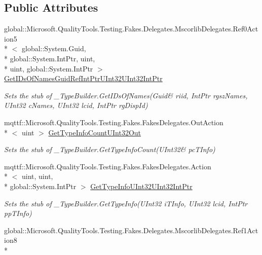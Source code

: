\subsection*{Public Attributes}
\begin{DoxyCompactItemize}
\item 
global\-::\-Microsoft.\-Quality\-Tools.\-Testing.\-Fakes.\-Delegates.\-Mscorlib\-Delegates.\-Ref0\-Action5\\*
$<$ global\-::\-System.\-Guid, \\*
global\-::\-System.\-Int\-Ptr, uint, \\*
uint, global\-::\-System.\-Int\-Ptr $>$ \hyperlink{class_system_1_1_runtime_1_1_interop_services_1_1_fakes_1_1_stub___type_builder_a99e63eac3e31e5f4d4971b116f23d112}{Get\-I\-Ds\-Of\-Names\-Guid\-Ref\-Int\-Ptr\-U\-Int32\-U\-Int32\-Int\-Ptr}
\begin{DoxyCompactList}\small\item\em Sets the stub of \-\_\-\-Type\-Builder.\-Get\-I\-Ds\-Of\-Names(Guid\& riid, Int\-Ptr rgsz\-Names, U\-Int32 c\-Names, U\-Int32 lcid, Int\-Ptr rg\-Disp\-Id)\end{DoxyCompactList}\item 
mqttf\-::\-Microsoft.\-Quality\-Tools.\-Testing.\-Fakes.\-Fakes\-Delegates.\-Out\-Action\\*
$<$ uint $>$ \hyperlink{class_system_1_1_runtime_1_1_interop_services_1_1_fakes_1_1_stub___type_builder_a4305a8f7eb35314e8bc191989b87adce}{Get\-Type\-Info\-Count\-U\-Int32\-Out}
\begin{DoxyCompactList}\small\item\em Sets the stub of \-\_\-\-Type\-Builder.\-Get\-Type\-Info\-Count(U\-Int32\& pc\-T\-Info)\end{DoxyCompactList}\item 
mqttf\-::\-Microsoft.\-Quality\-Tools.\-Testing.\-Fakes.\-Fakes\-Delegates.\-Action\\*
$<$ uint, uint, \\*
global\-::\-System.\-Int\-Ptr $>$ \hyperlink{class_system_1_1_runtime_1_1_interop_services_1_1_fakes_1_1_stub___type_builder_ab083c6cd6df5a9e16cae06da989a92b0}{Get\-Type\-Info\-U\-Int32\-U\-Int32\-Int\-Ptr}
\begin{DoxyCompactList}\small\item\em Sets the stub of \-\_\-\-Type\-Builder.\-Get\-Type\-Info(\-U\-Int32 i\-T\-Info, U\-Int32 lcid, Int\-Ptr pp\-T\-Info)\end{DoxyCompactList}\item 
global\-::\-Microsoft.\-Quality\-Tools.\-Testing.\-Fakes.\-Delegates.\-Mscorlib\-Delegates.\-Ref1\-Action8\\*

\end{DoxyCompactItemize}
